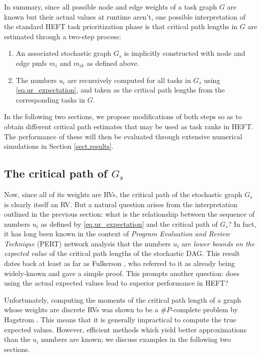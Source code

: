 \documentclass[12pt]{article}
\begin{document}
In summary, since all possible node and edge weights of a task graph $G$ are known but their actual values at runtime aren't, one possible interpretation of the standard HEFT task prioritization phase is that critical path lengths in $G$ are estimated through a two-step process:
\begin{enumerate}
	\item An associated stochastic graph $G_s$ is implicitly constructed with node and edge pmfs $m_i$ and $m_{ik}$ as defined above.   
	\item The numbers $u_i$ are recursively computed for all tasks in $G_s$ using \eqref{eq.ur_expectation}, and taken as the critical path lengths from the corresponding tasks in $G$.      
\end{enumerate}
In the following two sections, we propose modifications of both steps so as to obtain different critical path estimates that may be used as task ranks in HEFT. The performance of these will then be evaluated through extensive numerical simulations in Section \ref{sect.results}.

\subsection{The critical path of $G_s$}
\label{subsect.sharper_bounds}

Now, since all of its weights are RVs, the critical path of the stochastic graph $G_s$ is clearly itself an RV. But a natural question arises from the interpretation outlined in the previous section: what is the relationship between the sequence of numbers $u_i$ as defined by \eqref{eq.ur_expectation} and the critical path of $G_s$? In fact, it has long been known in the context of {\em Program Evaluation and Review Technique} (PERT) network analysis that the numbers $u_i$ are {\em lower bounds on the expected value} of the critical path lengths of the stochastic DAG. This result dates back at least as far as Fulkerson \cite{fulk62}, who referred to it as already being widely-known and gave a simple proof. This prompts another question: does using the actual expected values lead to superior performance in HEFT?

Unfortunately, computing the moments of the critical path length of a graph whose weights are discrete RVs was shown to be a $\#P$-complete problem by Hagstrom \cite{hagstrom88}. This means that it is generally impractical to compute the true expected values. However, efficient methods which yield better approximations than the $u_i$ numbers are known; we discuss examples in the following two sections.  
\end{document}
